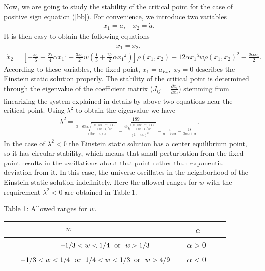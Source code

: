 \documentclass[showpacs,amsmath,nofootinbib,amssymb,epsfig]{revtex4}
\begin{document}
Now, we are going to study the stability of the critical point for the case of positive sign equation (\ref{bb}). For convenience, we introduce two  variables
\begin{eqnarray}
x_1=a,\quad x_2=\dot{a}.
\end{eqnarray}
It is then easy to obtain the following equations
\begin{eqnarray}
\dot{x}_1=x_2,
\end{eqnarray}
\begin{eqnarray}
\dot{x}_2=\left[-\frac{x_1}{6}+\frac{27}{4}\alpha {x_1}^{3}-\frac{3{x_1}}{2}w\left(\frac{1}{3}+\frac{27}{2}\alpha {x_1}^{2}\right)\right]\rho(x_1,x_2)+12\alpha {x_1}^{5}w\rho(x_1,x_2)^{2}-\frac{9\alpha {x_1}}{2}.
\end{eqnarray}
According to these variables, the fixed point, $x_1=a_{Es},\; x_2=0$ describes the Einstein static solution properly. The stability of the critical
point is determined through the eigenvalue of the coefficient matrix ($J_{ij}=\frac{\partial \dot{x}_{i}}{\partial x_{j}} $)
stemming from linearizing the system explained in details by above two equations near the critical point. Using $\lambda^2$ to obtain the
eigenvalue we have
\begin{eqnarray}\label{ll}
\lambda^2=\frac{189}{\frac{3-63 \alpha  \sqrt{\frac{(w (12 w-7)+1)^2}{(3 w+1)^4 \alpha ^2}}}{(9 w-4) \alpha }-\frac{49 \sqrt{\frac{(w (12 w-7)+1)^2}{(3 w+1)^4 \alpha ^2}}}{(1-4w)^2}-\frac{4}{\alpha -4 w \alpha }-\frac{18}{3 w \alpha +\alpha }}.
\end{eqnarray}
In the case of $\lambda^{2}< 0$ the Einstein static solution has a center
equilibrium point, so it has circular stability, which means that small perturbation from the fixed
point results in the oscillations about that point rather than exponential deviation from it. In
this case, the universe oscillates in the neighborhood of the Einstein static solution
indefinitely.
Here the allowed ranges for $w$ with the requirement $\lambda^{2}< 0$ are obtained in Table 1.
\vspace{5mm}
\begin{center}
{\scriptsize{ Table 1: }}\hspace{-2mm} {\scriptsize Allowed ranges for $w$.}\\
    \begin{tabular}{|l| l |l |  p{800mm} }
    \hline
   {\footnotesize$~~~~~~~~~~~~~~~~~~~~~~~~~~~~~~~~~w$ }& ~~{\footnotesize~ $\alpha$ }  \\ \hline
{\footnotesize ~~~~~~~~~~~~~$-1/3 < w < 1/4~~ {\rm or}~~ w > 1/3$} & ~~{\footnotesize $\alpha>0$} \\\hline
 {\footnotesize ~~~$-1/3 < w < 1/4 ~~ {\rm or}~~  1/4 < w < 1/3 ~~ {\rm or}~~  w > 4/9$} & ~{\footnotesize  ~$\alpha<0$}
\\ \hline
    \end{tabular}
\end{center}
\end{document}
